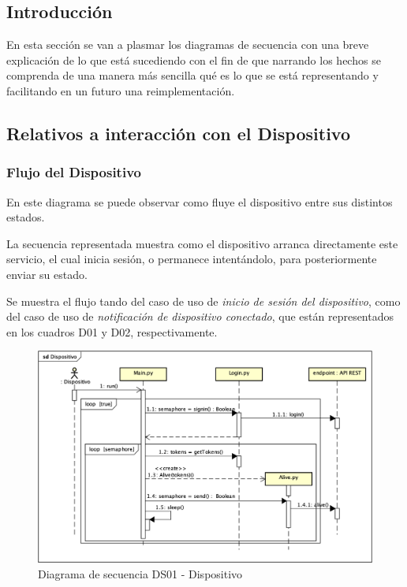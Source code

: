 
\subsection{Introducción}

En esta sección se van a plasmar los diagramas de secuencia con una breve explicación de lo que está sucediendo con el fin de que narrando los hechos se comprenda de una manera más sencilla qué es lo que se está representando y facilitando en un futuro una reimplementación.

\subsection{Relativos a interacción con el Dispositivo}

\subsubsection{Flujo del Dispositivo}

En este diagrama se puede observar como fluye el dispositivo entre sus distintos estados.

La secuencia representada muestra como el dispositivo arranca directamente este servicio, el cual inicia sesión, o permanece intentándolo, para posteriormente enviar su estado.

Se muestra el flujo tando del caso de uso de \textit{inicio de sesión del dispositivo}, como del caso de uso de \textit{notificación de dispositivo conectado}, que están representados en los cuadros D01 y D02, respectivamente.

\begin{figure}[H]
    \centering
    \includegraphics[width=12cm]{./img/sequence/diagram/device.png}
    \caption{Diagrama de secuencia DS01 - Dispositivo}
    \label{fig:seq.device}
\end{figure}

